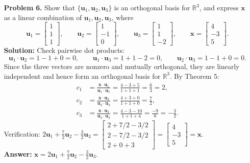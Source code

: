 \documentclass[11pt, letterpaper]{article}
\theoremstyle{definition}
\theoremstyle{remark}
\begin{document}
\textbf{Problem 6.} Show that $\{\mathbf{u}_1, \mathbf{u}_2, \mathbf{u}_3\}$ is an orthogonal basis for $\mathbb{R}^3$, and express $\mathbf{x}$ as a linear combination of $\mathbf{u}_1, \mathbf{u}_2, \mathbf{u}_3$, where
\[
\mathbf{u}_1 = \begin{bmatrix} 1 \\ 1 \\ 1 \end{bmatrix}, \qquad
\mathbf{u}_2 = \begin{bmatrix} 1 \\ -1 \\ 0 \end{bmatrix}, \qquad
\mathbf{u}_3 = \begin{bmatrix} 1 \\ 1 \\ -2 \end{bmatrix}, \qquad
\mathbf{x} = \begin{bmatrix} 4 \\ -3 \\ 5 \end{bmatrix}.
\]
\textbf{Solution:} Check pairwise dot products:
\[
\mathbf{u}_1 \cdot \mathbf{u}_2 = 1 - 1 + 0 = 0, \qquad
\mathbf{u}_1 \cdot \mathbf{u}_3 = 1 + 1 - 2 = 0, \qquad
\mathbf{u}_2 \cdot \mathbf{u}_3 = 1 - 1 + 0 = 0.
\]
Since the three vectors are nonzero and mutually orthogonal, they are linearly independent and hence form an orthogonal basis for $\mathbb{R}^3$. By Theorem 5:
\begin{align*}
c_1 &= \frac{\mathbf{x} \cdot \mathbf{u}_1}{\mathbf{u}_1 \cdot \mathbf{u}_1} = \frac{4 - 3 + 5}{1 + 1 + 1} = \frac{6}{3} = 2, \\
c_2 &= \frac{\mathbf{x} \cdot \mathbf{u}_2}{\mathbf{u}_2 \cdot \mathbf{u}_2} = \frac{4 + 3 + 0}{1 + 1 + 0} = \frac{7}{2}, \\
c_3 &= \frac{\mathbf{x} \cdot \mathbf{u}_3}{\mathbf{u}_3 \cdot \mathbf{u}_3} = \frac{4 - 3 - 10}{1 + 1 + 4} = \frac{-9}{6} = -\frac{3}{2}.
\end{align*}
Verification: $2\mathbf{u}_1 + \frac{7}{2}\mathbf{u}_2 - \frac{3}{2}\mathbf{u}_3 = \begin{bmatrix} 2 + 7/2 - 3/2 \\ 2 - 7/2 - 3/2 \\ 2 + 0 + 3 \end{bmatrix} = \begin{bmatrix} 4 \\ -3 \\ 5 \end{bmatrix} = \mathbf{x}$. \\
\textbf{Answer:} $\mathbf{x} = 2\mathbf{u}_1 + \frac{7}{2}\mathbf{u}_2 - \frac{3}{2}\mathbf{u}_3$.
\end{document}
